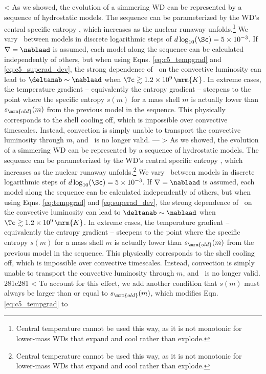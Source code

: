 < As we showed, the evolution of a simmering WD can be represented by a sequence of hydrostatic models.  The sequence can be parameterized by the WD's central specific entropy \Sc, which increases as the nuclear runaway unfolds.\footnote{Central temperature \Tc cannot be used this way, as it is not monotonic for lower-mass WDs that expand and cool rather than explode.}  We vary \Sc\ between models in discrete logarithmic steps of $d\log_{10}(\Sc) = 5 \times 10^{-3}$.  If $\nabla = \nablaad$ is assumed, each model along the sequence can be calculated independently of others, but when using Eqns. \ref{eq:c5_tempgrad} and \ref{eq:c5_superad_dev}, the strong dependence of \vconv\ on the convective luminosity can lead to $\deltanab \sim \nablaad$ when $\Tc \gtrsim 1.2\times10^9\,\mrm{K}$.  In extreme cases, the temperature gradient -- equivalently the entropy gradient -- steepens to the point where the specific entropy $s(m)$ for a mass shell $m$ is actually lower than $s_\mrm{old}(m)$ from the previous model in the sequence.  This physically corresponds to the shell cooling off, which is impossible over convective timescales.  Instead, convection is simply unable to transport the convective luminosity through $m$, and \dnabconv\ is no longer valid.
---
> As we showed, the evolution of a simmering WD can be represented by a sequence of hydrostatic models.  The sequence can be parameterized by the WD's central specific entropy \Sc, which increases as the nuclear runaway unfolds.\footnote{Central temperature \Tc cannot be used this way, as it is not monotonic for lower-mass WDs that expand and cool rather than explode.}  We vary \Sc\ between models in discrete logarithmic steps of $d\log_{10}(\Sc) = 5 \times 10^{-3}$.  If $\nabla = \nablaad$ is assumed, each model along the sequence can be calculated independently of others, but when using Eqns. \ref{eq:tempgrad} and \ref{eq:superad_dev}, the strong dependence of \vconv\ on the convective luminosity can lead to $\deltanab \sim \nablaad$ when $\Tc \gtrsim 1.2\times10^9\,\mrm{K}$.  In extreme cases, the temperature gradient -- equivalently the entropy gradient -- steepens to the point where the specific entropy $s(m)$ for a mass shell $m$ is actually lower than $s_\mrm{old}(m)$ from the previous model in the sequence.  This physically corresponds to the shell cooling off, which is impossible over convective timescales.  Instead, convection is simply unable to transport the convective luminosity through $m$, and \dnabconv\ is no longer valid.
281c281
< To account for this effect, we add another condition that $s(m)$ must always be larger than or equal to $s_\mrm{old}(m)$, which modifies Eqn. \ref{eq:c5_tempgrad} to

